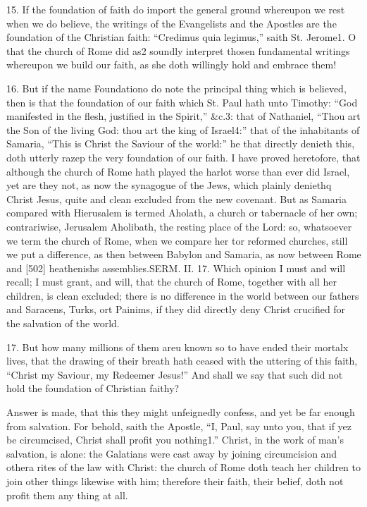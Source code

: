 15. If the foundation of faith do import the general ground whereupon we rest when we do believe, the writings of the Evangelists and the Apostles are the foundation of the Christian faith: “Credimus quia legimus,” saith St. Jerome1. O that the church of Rome did as2 soundly interpret thosen fundamental writings whereupon we build our faith, as she doth willingly hold and embrace them!

16. But if the name Foundationo do note the principal thing which is believed, then is that the foundation of our faith which St. Paul hath unto Timothy: “God manifested in the flesh, justified in the Spirit,” &c.3: that of Nathaniel, “Thou art the Son of the living God: thou art the king of Israel4:” that of the inhabitants of Samaria, “This is Christ the Saviour of the world:” he that directly denieth this, doth utterly razep the very foundation of our faith. I have proved heretofore, that although the church of Rome hath played the harlot worse than ever did Israel, yet are they not, as now the synagogue of the Jews, which plainly deniethq Christ Jesus, quite and clean excluded from the new covenant. But as Samaria compared with Hierusalem is termed Aholath, a church or tabernacle of her own; contrariwise, Jerusalem Aholibath, the resting place of the Lord: so, whatsoever we term the church of Rome, when we compare her tor reformed churches, still we put a difference, as then between Babylon and Samaria, as now between Rome and [502] heathenishs assemblies.SERM. II. 17. Which opinion I must and will recall; I must grant, and will, that the church of Rome, together with all her children, is clean excluded; there is no difference in the world between our fathers and Saracens, Turks, ort Painims, if they did directly deny Christ crucified for the salvation of the world.

17. But how many millions of them areu known so to have ended their mortalx lives, that the drawing of their breath hath ceased with the uttering of this faith, “Christ my Saviour, my Redeemer Jesus!” And shall we say that such did not hold the foundation of Christian faithy?

Answer is made, that this they might unfeignedly confess, and yet be far enough from salvation. For behold, saith the Apostle, “I, Paul, say unto you, that if yez be circumcised, Christ shall profit you nothing1.” Christ, in the work of man’s salvation, is alone: the Galatians were cast away by joining circumcision and othera rites of the law with Christ: the church of Rome doth teach her children to join other things likewise with him; therefore their faith, their belief, doth not profit them any thing at all.

